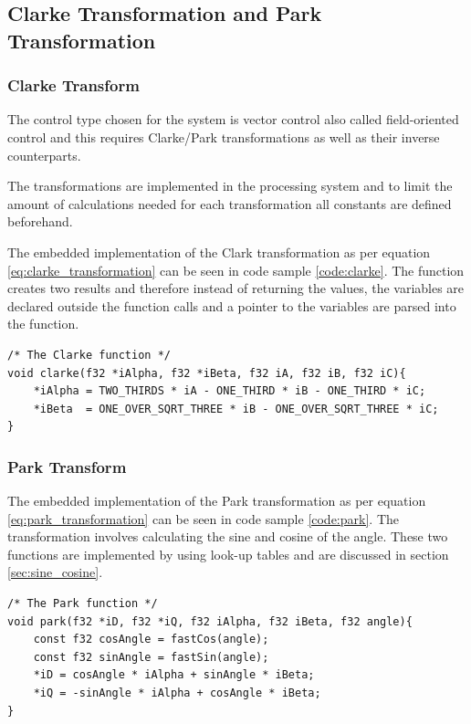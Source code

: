 \subsection{Clarke Transformation and Park Transformation}

\subsubsection*{Clarke Transform}

The control type chosen for the system is vector control also called field-oriented control and this requires Clarke/Park transformations as well as their inverse counterparts.

The transformations are implemented in the processing system and to limit the amount of calculations needed for each transformation all constants are defined beforehand.

The embedded implementation of the Clark transformation as per equation \ref{eq:clarke_transformation} can be seen in code sample \ref{code:clarke}. The function creates two results and therefore instead of returning the values, the variables are declared outside the function calls and a pointer to the variables are parsed into the function.

\begin{lstlisting}[style=c, caption=Embedded Clarke Transformation., label=code:clarke]
/* The Clarke function */
void clarke(f32 *iAlpha, f32 *iBeta, f32 iA, f32 iB, f32 iC){
	*iAlpha = TWO_THIRDS * iA - ONE_THIRD * iB - ONE_THIRD * iC;
	*iBeta  = ONE_OVER_SQRT_THREE * iB - ONE_OVER_SQRT_THREE * iC;
}
\end{lstlisting}

\subsubsection*{Park Transform}
The embedded implementation of the Park transformation as per equation \ref{eq:park_transformation} can be seen in code sample \ref{code:park}. The transformation involves calculating the sine and cosine of the angle. These two functions are implemented by using look-up tables and are discussed in section \ref{sec:sine_cosine}.

\begin{lstlisting}[style=c, caption=Embedded Park Transformation., label=code:park]
/* The Park function */
void park(f32 *iD, f32 *iQ, f32 iAlpha, f32 iBeta, f32 angle){
	const f32 cosAngle = fastCos(angle);
	const f32 sinAngle = fastSin(angle);
	*iD = cosAngle * iAlpha + sinAngle * iBeta;
	*iQ = -sinAngle * iAlpha + cosAngle * iBeta;
}
\end{lstlisting}

